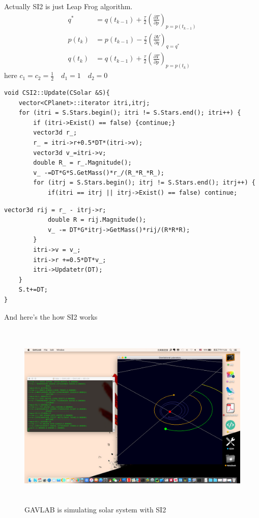\documentclass[12pt]{article}
\begin{document}
Actually SI2 is just Leap Frog algorithm.
\begin{equation}
\begin{aligned}
q^{*} &= q(t_{k-1}) + \frac{\tau}{2}\left( \frac{\partial T}{\partial p}\right)_{p=p(t_{k-1})} \\ 
p(t_{k}) &= p(t_{k-1}) - \frac{\tau}{2}\left( \frac{\partial V}{\partial q}\right)_{q=q^{*}} \\
q(t_{k}) &= q(t_{k-1}) + \frac{\tau}{2}\left( \frac{\partial T}{\partial p}\right)_{p=p(t_{k})}
\end{aligned}
\end{equation}
here $c_{1}=c_{2}=\frac{1}{2}\quad d_{1}=1\quad d_{2}=0$

\begin{lstlisting}[caption=CSI2 Part I]
void CSI2::Update(CSolar &S){
    vector<CPlanet>::iterator itri,itrj;
    for (itri = S.Stars.begin(); itri != S.Stars.end(); itri++) {
        if (itri->Exist() == false) {continue;}
        vector3d r_;
        r_ = itri->r+0.5*DT*(itri->v);
        vector3d v_=itri->v;
        double R_ = r_.Magnitude();
        v_ -=DT*G*S.GetMass()*r_/(R_*R_*R_);
        for (itrj = S.Stars.begin(); itrj != S.Stars.end(); itrj++) {
            if(itri == itrj || itrj->Exist() == false) continue;
\end{lstlisting}
\begin{lstlisting}[caption=CSI2 Part II]
            vector3d rij = r_ - itrj->r;
            double R = rij.Magnitude();
            v_ -= DT*G*itrj->GetMass()*rij/(R*R*R);
        }
        itri->v = v_;
        itri->r +=0.5*DT*v_;
        itri->Updatetr(DT);
    }
    S.t+=DT;
}
\end{lstlisting}

And here's the how SI2 works

\begin{figure}[H]
\centering
\includegraphics[width=14.4cm,height=9cm]{SI2.png}
\caption{GAVLAB is simulating solar system with SI2}
\end{figure}
\end{document}
